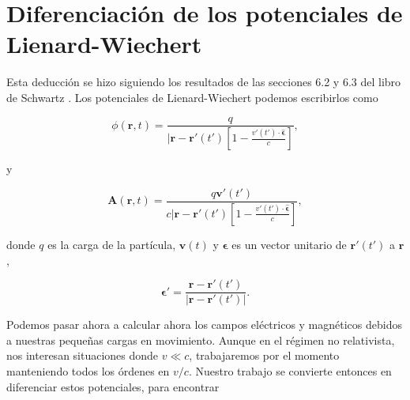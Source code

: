 \documentclass[a4paper,11pt]{article}
\numberwithin{equation}{section}
\renewcommand{\thefootnote}{\fnsymbol{footnote}}
\begin{document}

\fancyhead[R]{\thepage}

\setcounter{footnote}{0}
\renewcommand*{\thefootnote}{\arabic{footnote}}


\section{Diferenciación de los potenciales de Lienard-Wiechert}

Esta deducción se hizo siguiendo los resultados de las secciones 6.2 y 6.3 del 
libro de Schwartz \cite{schwartz}. Los potenciales de Lienard-Wiechert podemos 
escribirlos como 

\begin{equation}
 \phi(\mathbf{r},t) = \frac{q}{|\mathbf{r}-\mathbf{r}'(t')\left[1 - 
 \frac{v'(t')\cdot \hat{\mathbf{\epsilon}}}{c}\right]},
\end{equation}

y 

\begin{equation}
 \mathbf{A}(\mathbf{r},t) = \frac{q\mathbf{v}'(t')}{c|\mathbf{r}-\mathbf{r}'(t')\left[1 - 
 \frac{v'(t')\cdot \hat{\mathbf{\epsilon}}}{c}\right]},
\end{equation}

donde $q$ es la carga de la partícula, $\mathbf{v}(t)$ y $\mathbf{\epsilon}$ 
es un vector unitario de $\mathbf{r}'(t')$ a $\mathbf{r}$, 

\begin{equation}
 \mathbf{\epsilon}' = \frac{\mathbf{r}-\mathbf{r}'(t')}{|\mathbf{r}-\mathbf{r}'(t')|}.
\end{equation}

Podemos pasar ahora a calcular ahora los campos eléctricos y magnéticos debidos a 
nuestras pequeñas cargas en movimiento. Aunque en el régimen no relativista, nos 
interesan situaciones donde $v \ll c$, trabajaremos por el momento manteniendo 
todos los órdenes en $v/c$. Nuestro trabajo se convierte entonces en diferenciar 
estos potenciales, para encontrar 
\end{document}
